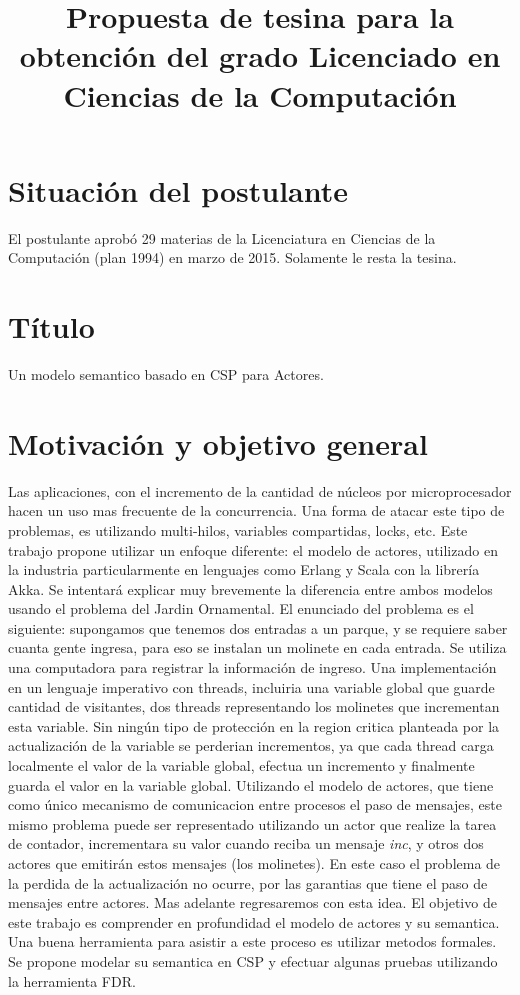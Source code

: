 \documentclass{article}
\begin{document}
\title{Propuesta de tesina para la obtención del grado
Licenciado en Ciencias de la Computación}

\maketitle

\section{Situación del postulante}
El postulante aprobó 29 materias de la Licenciatura en Ciencias de la Computación (plan 1994) en marzo de 2015. Solamente le resta la tesina.

\section{Título}
Un modelo semantico basado en CSP para Actores.

\section{Motivación y objetivo general}

Las aplicaciones, con el incremento de la cantidad de núcleos por microprocesador hacen un uso mas frecuente de la concurrencia. Una forma de atacar este tipo de problemas, es utilizando multi-hilos, variables compartidas, locks, etc. Este trabajo propone utilizar un enfoque diferente: el modelo de actores, utilizado en la industria particularmente en lenguajes como Erlang\cite{Cesarini:2009:EP:1717841} y Scala\cite{scala-overview-tech-report} con la librería Akka\cite{Wyatt:2013:AC:2663429}. 
Se intentará explicar muy brevemente la diferencia entre ambos modelos usando el problema del Jardin Ornamental. El enunciado del problema es el siguiente: supongamos que tenemos dos entradas a un parque, y se requiere saber cuanta gente ingresa, para eso se instalan un molinete en cada entrada. Se utiliza una computadora para registrar la información de ingreso.
Una implementación en un lenguaje imperativo con threads, incluiria una variable global que guarde cantidad de visitantes, dos threads representando los molinetes que incrementan esta variable. Sin ningún tipo de protección en la region critica planteada por la actualización de la variable se perderian incrementos, ya que cada thread carga localmente el valor de la variable global, efectua un incremento y finalmente guarda el valor en la variable global. 
Utilizando el modelo de actores, que tiene como único mecanismo de comunicacion entre procesos el paso de mensajes, este mismo problema puede ser representado utilizando un actor que realize la tarea de contador, incrementara su valor cuando reciba un mensaje \emph{inc}, y otros dos actores que emitirán estos mensajes (los molinetes). En este caso el problema de la perdida de la actualización no ocurre, por las garantias que tiene el paso de mensajes entre actores. Mas adelante regresaremos con esta idea. 
El objetivo de este trabajo es comprender en profundidad el modelo de actores y su semantica. Una buena herramienta para asistir a este proceso es utilizar metodos formales. Se propone modelar su semantica en CSP y efectuar algunas pruebas utilizando la herramienta FDR\cite{fdr}.
\end{document}
